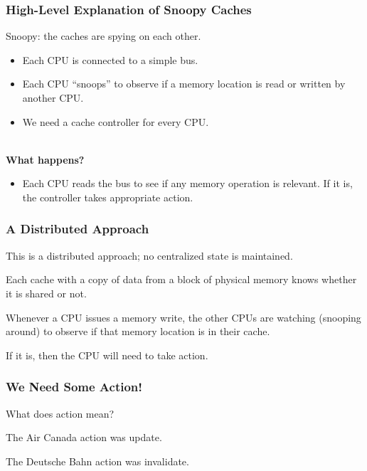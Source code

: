\begin{frame}
  \frametitle{High-Level Explanation of Snoopy Caches}

  Snoopy: the caches are spying on each other.
  
  \begin{itemize}
    \item Each CPU is connected to a simple bus.
    \item Each CPU ``snoops'' to observe if a memory location is read or written
      by another CPU.
    \item We need a cache controller for every CPU.
  \end{itemize}
  ~\\
  {\bf What happens?}

  \begin{itemize}
    \item Each CPU reads the bus to see if any memory operation is relevant. If
      it is, the controller takes appropriate action.
  \end{itemize}
  
\end{frame}

\begin{frame}
\frametitle{A Distributed Approach}


This is a distributed approach; no centralized state is maintained. 

Each cache with a copy of data from a block of physical memory knows whether it is shared or not. 

Whenever a CPU issues a memory write, the other CPUs are watching (snooping around) to observe if that memory location is in their cache. 

If it is, then the CPU will need to take action.

\end{frame}


\begin{frame}
\frametitle{We Need Some Action!}

What does action mean?

The Air Canada action was \alert{update}.

The Deutsche Bahn action was \alert{invalidate}.

\end{frame}



